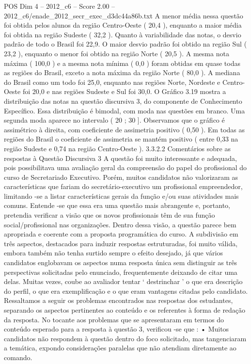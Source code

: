 \begin{textsample}{POS Dim 4 – 2012\_c6 – Score 2.00 – 2012\_c6/enade\_2012\_secr\_exec\_d3dc44a86b.txt}
A menor média nessa questão foi obtida pelos alunos da região Centro-Oeste ( 20,4 ), enquanto a maior média foi obtida na região Sudeste ( 32,2 ).
Quanto à variabilidade das notas, o desvio padrão de todo o Brasil foi 22,9.
O maior desvio padrão foi obtido na região Sul ( 23,2 ), enquanto o menor foi obtido na região Norte ( 20,5 ).
A mesma nota máxima ( 100,0 ) e a mesma nota mínima ( 0,0 ) foram obtidas em quase todas as regiões do Brasil, exceto a nota máxima da região Norte ( 80,0 ).
A mediana do Brasil como um todo foi 25,0, enquanto nas regiões Norte, Nordeste e Centro-Oeste foi 20,0 e nas regiões Sudeste e Sul foi 30,0.
O Gráfico 3.19 mostra a distribuição das notas na questão discursiva 3, do componente de Conhecimento Específico.
Essa distribuição é bimodal, com moda nas questões em branco.
Uma segunda moda aparece no intervalo ( 20 ; 30 ].
Observamos que o gráfico é assimétrico à direita, com coeficiente de assimetria positivo ( 0,50 ).
Em todas as regiões do Brasil o coeficiente de assimetria se mantém positivo ( entre 0,33 na região Sudeste e 0,74 na região Centro-Oeste ). 3.3.2.2 Comentários sobre as respostas à Questão Discursiva 3 A questão foi muito interessante e adequada, pois possibilitava uma avaliação geral da compreensão do papel do profissional do curso de Secretariado Executivo.
Porém, muitos candidatos não valorizaram as características que fariam do secretário-executivo um profissional empreendedor, limitando -se a listar características gerais da função e/ou suas atividades mais comuns.
Entende -se que essa era uma questão mais abrangente e, portanto, pretendia verificar a visão que os novos profissionais têm de sua função social/profissional nas organizações.
Dentro dessa visão, a questão parece bem apropriada e coerente com a proposta programática do curso.
A subdivisão em três aspectos, destacados para induzir respostas estruturadas, foi muito válida, embora também não tenha surtido sempre o efeito desejado, já que vários candidatos englobavam os aspectos numa resposta única sem distinguir as três perspectivas solicitadas pelo enunciado, frequentemente deixando de citar uma delas.
Muitas vezes, coube ao avaliador tentar ‘ destrinchar ’ o que era descrição do perfil, o que era exemplificação e o que eram vantagens citadas pelo candidato.
Ressaltamos a seguir os problemas encontrados nas respostas dos estudantes, separando os aspectos pertinentes ao conteúdo e os referentes à forma de redação da resposta.
No tocante aos problemas que se apresentaram em termos do conteúdo esperado para a resposta à questão 3, verificou -se que : • Muitos candidatos não respondem à questão dentro do foco solicitado, mas tangenciaram a temática, expondo considerações paralelas que não atendiam diretamente ao comando.

\end{textsample}
